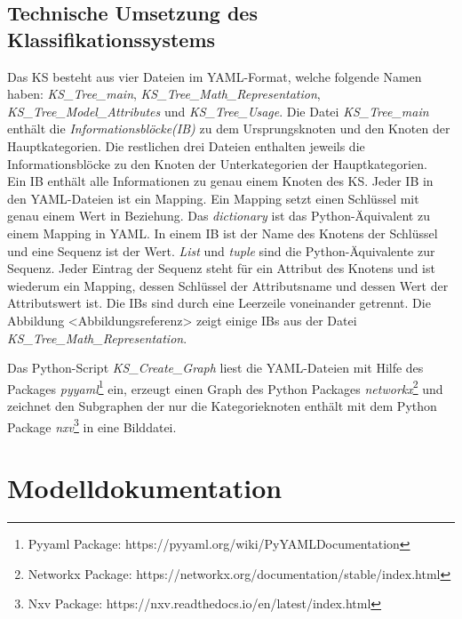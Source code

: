 \subsection{Technische Umsetzung des Klassifikationssystems}
\label{Ch:Ergebnisse:Sec:KS:SubSec:TechUmsetzung}
Das KS besteht aus vier Dateien im YAML-Format, welche folgende Namen haben: \textit{KS\_Tree\_main}, \textit{KS\_Tree\_Math\_Representation}, \textit{KS\_Tree\_Model\_Attributes} und \textit{KS\_Tree\_Usage}. Die Datei \textit{KS\_Tree\_main} enthält die \textit{Informationsblöcke(IB)} zu dem Ursprungsknoten und den Knoten der Hauptkategorien. Die restlichen drei Dateien enthalten jeweils die Informationsblöcke zu den Knoten der Unterkategorien der Hauptkategorien. \\ 
Ein IB enthält alle Informationen zu genau einem Knoten des KS. Jeder IB in den YAML-Dateien ist ein Mapping. Ein Mapping setzt einen Schlüssel mit genau einem Wert in Beziehung. Das \textit{dictionary} ist das Python-Äquivalent zu einem Mapping in YAML. In einem IB ist der Name des Knotens der Schlüssel und eine Sequenz ist der Wert. \textit{List} und \textit{tuple} sind die Python-Äquivalente zur Sequenz. Jeder Eintrag der Sequenz steht für ein Attribut des Knotens und ist wiederum ein Mapping, dessen Schlüssel der Attributsname und dessen Wert der Attributswert ist. Die IB\grq s sind durch eine Leerzeile voneinander getrennt. Die Abbildung <Abbildungsreferenz> zeigt einige IB\grq s aus der Datei \textit{KS\_Tree\_Math\_Representation}. %

Das Python-Script \textit{KS\_Create\_Graph} liest die YAML-Dateien mit Hilfe des Packages \textit{pyyaml}\footnote{Pyyaml Package: https://pyyaml.org/wiki/PyYAMLDocumentation} ein, erzeugt einen Graph des Python Packages \textit{networkx}\footnote{Networkx Package: https://networkx.org/documentation/stable/index.html} und zeichnet den Subgraphen der nur die Kategorieknoten enthält mit dem Python Package \textit{nxv}\footnote{Nxv Package: https://nxv.readthedocs.io/en/latest/index.html} in eine Bilddatei.

\section{Modelldokumentation}
\label{Ch:Ergebnisse:Sec:Dokumentation}


